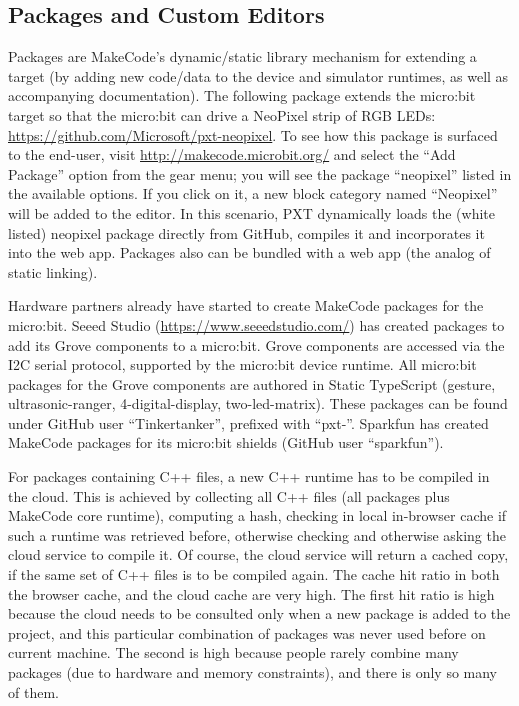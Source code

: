 \subsection{Packages and Custom Editors}

Packages are MakeCode's dynamic/static library mechanism for extending a target (by adding new code/data to the device
and simulator runtimes, as well as accompanying documentation). The following package extends the micro:bit target so
that the micro:bit can drive a NeoPixel strip of RGB LEDs: \url{https://github.com/Microsoft/pxt-neopixel}. To see how this
package is surfaced to the end-user, visit \url{http://makecode.microbit.org/} and select the ``Add Package'' option from the
gear menu; you will see the package ``neopixel'' listed in the available options. If you click on it, a new block category
named ``Neopixel'' will be added to the editor. In this scenario, PXT dynamically loads the (white listed) neopixel 
package directly from GitHub, compiles it and incorporates it into the web app. Packages also can be bundled with a web
app (the analog of static linking).  

Hardware partners already have started to create MakeCode packages for the micro:bit.
Seeed Studio (\url{https://www.seeedstudio.com/}) has created packages to add its Grove components to a micro:bit.
Grove components are accessed via the I2C serial protocol, supported by the micro:bit device runtime.
All micro:bit packages for the Grove components are authored in Static TypeScript (gesture, ultrasonic-ranger,
4-digital-display, two-led-matrix). These packages can be found under GitHub user ``Tinkertanker'', prefixed with
``pxt-''. Sparkfun has created MakeCode packages for its micro:bit shields (GitHub user ``sparkfun'').


For packages containing C++ files, a new C++ runtime has to be compiled in the cloud.
This is achieved by collecting all C++ files (all packages plus MakeCode core runtime),
computing a hash, checking in local in-browser cache if such a runtime was retrieved
before, otherwise checking and otherwise asking the cloud service to compile it.
Of course, the cloud service will return a cached copy, if the same set of C++
files is to be compiled again. The cache hit ratio in both the browser cache,
and the cloud cache are very high. 
The first hit ratio is high because the cloud needs to be consulted
only when a new package is added to the project, and this particular combination 
of packages was never used before on current machine.
The second is high because people rarely combine many packages (due to
hardware and memory constraints), and there is only so many of them.
